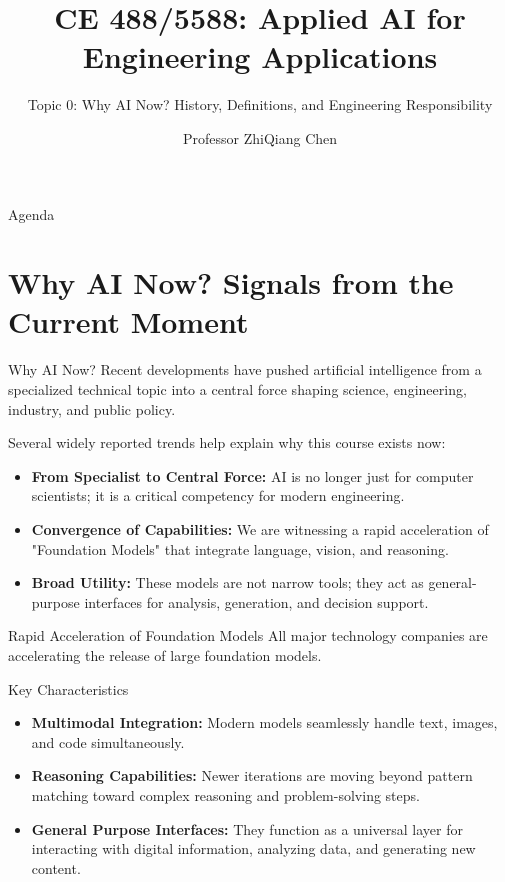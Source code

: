 \documentclass[german,10pt]{beamer}
\title{CE 488/5588: Applied AI for Engineering Applications}
\subtitle{Topic 0: Why AI Now? History, Definitions, and Engineering Responsibility}
\author{Professor ZhiQiang Chen}
\institute{School of Science and Engineering\\University of Missouri--Kansas City}
\date{}
\begin{document}
\begin{frame}
  \titlepage
\end{frame}

\begin{frame}{Agenda}
    \tableofcontents
\end{frame}

\section{Why AI Now? Signals from the Current Moment}

\begin{frame}{Why AI Now?}
    \justifying
    Recent developments have pushed artificial intelligence from a specialized technical topic into a central force shaping science, engineering, industry, and public policy.
    
    \vspace{1em}
    Several widely reported trends help explain why this course exists now:
    \begin{itemize}
        \item \textbf{From Specialist to Central Force:} AI is no longer just for computer scientists; it is a critical competency for modern engineering.
        \item \textbf{Convergence of Capabilities:} We are witnessing a rapid acceleration of "Foundation Models" that integrate language, vision, and reasoning.
        \item \textbf{Broad Utility:} These models are not narrow tools; they act as general-purpose interfaces for analysis, generation, and decision support.
    \end{itemize}
\end{frame}

\begin{frame}{Rapid Acceleration of Foundation Models}
    \justifying
    All major technology companies are accelerating the release of large foundation models.
    
    \vspace{1em}
    \begin{conceptbox}{Key Characteristics}
    \begin{itemize}
        \item \textbf{Multimodal Integration:} Modern models seamlessly handle text, images, and code simultaneously.
        \item \textbf{Reasoning Capabilities:} Newer iterations are moving beyond pattern matching toward complex reasoning and problem-solving steps.
        \item \textbf{General Purpose Interfaces:} They function as a universal layer for interacting with digital information, analyzing data, and generating new content.
    \end{itemize}
    \end{conceptbox}
\end{frame}
\end{document}
